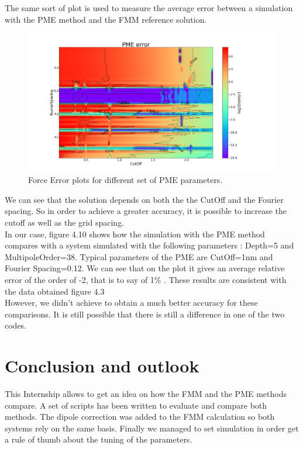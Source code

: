\documentclass[10pt,twoside,a4paper]{report}
\begin{document}
The same sort of plot is used to measure the average error between a simulation with the PME method and the FMM reference solution. 

\begin{figure}[H]
	   \includegraphics[scale=0.3]{PME_error}
	    \centering 
    \caption{Force Error plots for different set of PME parameters.}    
   \end{figure}

We can see that the solution depends on both the the CutOff and the Fourier spacing. So in order to achieve a greater accuracy, it is possible to increase the cutoff as well as the grid spacing.\\

In our case, figure 4.10 shows how the simulation with the PME method compares with a system simulated with the following parameters : Depth=5 and MultipoleOrder=38.
	Typical parameters of the PME are CutOff=1nm and Fourier Spacing=0.12. We can see that on the plot it gives an average relative error of the order of -2, that is to say of 1$\%$ . These results are consistent with the data obtained figure 4.3\\

However, we didn't achieve to obtain a much better accuracy for these comparisons. It is still possible that there is still a difference in one of the two codes.

\chapter{Conclusion and outlook}

This Internship allows to get an idea on how the FMM and the PME methods compare. A set of scripts has been written to evaluate and compare both methods. The dipole correction was added to the FMM calculation so both systems rely on the same basis. Finally we managed to set simulation in order get a rule of thumb about the tuning of the parameters.\\
\end{document}
